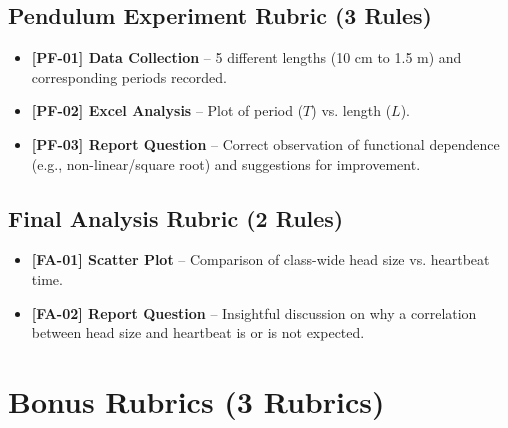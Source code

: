 \documentclass{article}
\begin{document}
\subsection*{Pendulum Experiment Rubric (3 Rules)}
\begin{itemize}
\item \textbf{ [PF-01] Data Collection } –  5 different lengths (10 cm to 1.5 m) and corresponding periods recorded.
\item \textbf{ [PF-02] Excel Analysis } –  Plot of period ($ T $) vs. length ($ L $).
\item \textbf{ [PF-03] Report Question } –  Correct observation of functional dependence (e.g., non-linear/square root) and suggestions for improvement.
\end{itemize}

\subsection*{Final Analysis Rubric (2 Rules)}
\begin{itemize}
\item \textbf{ [FA-01] Scatter Plot } –  Comparison of class-wide head size vs. heartbeat time.
\item \textbf{ [FA-02] Report Question } –  Insightful discussion on why a correlation between head size and heartbeat is or is not expected.
\end{itemize}

\section*{Bonus Rubrics (3 Rubrics)}
\end{document}
